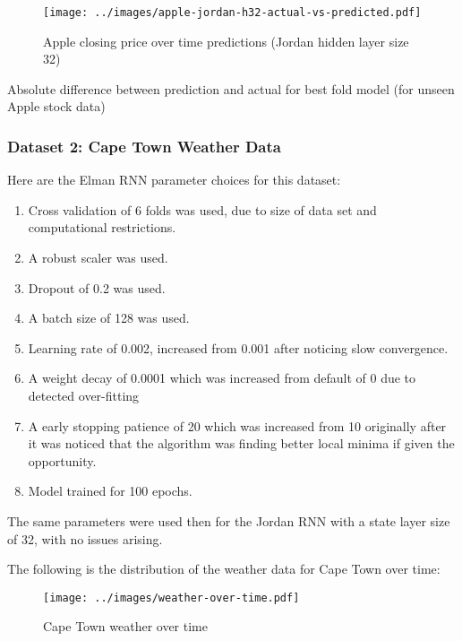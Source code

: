 \documentclass[conference]{IEEEtran}
\begin{document}
\begin{figure}[H] 
	\centering
	\texttt{[image: ../images/apple-jordan-h32-actual-vs-predicted.pdf]}
	\caption{Apple closing price over time predictions (Jordan hidden layer size 32)}
	\label{fig:apple-closing-predictions-jordan}
\end{figure}

\begin{table}[htbp]
	\caption{Absolute difference between prediction and actual for best fold model (for unseen Apple stock data)}
	\label{tab:apple-rnn-summary}
\end{table}



\subsubsection{Dataset 2: Cape Town Weather Data}

Here are the Elman RNN parameter choices for this dataset:

\begin{enumerate}[]
	\item Cross validation of 6 folds was used, due to size of data set and computational restrictions.
	\item A robust scaler was used.
	\item Dropout of 0.2 was used.
	\item A batch size of 128 was used.
	\item Learning rate of 0.002, increased from 0.001 after noticing slow convergence.
	\item A weight decay of 0.0001 which was increased from default of 0 due to detected over-fitting
	\item A early stopping patience of 20 which was increased from 10 originally after it was noticed that the algorithm was finding better local minima if given the opportunity.
	\item Model trained for 100 epochs.
\end{enumerate}

The same parameters were used then for the Jordan RNN with a state layer size of 32, with no issues arising.

The following is the distribution of the weather data for Cape Town over time:

\begin{figure}[htbp] 
	\centering
	\texttt{[image: ../images/weather-over-time.pdf]}
	\caption{Cape Town weather over time}
	\label{fig:cape-town-weather-time}
\end{figure}
\end{document}
